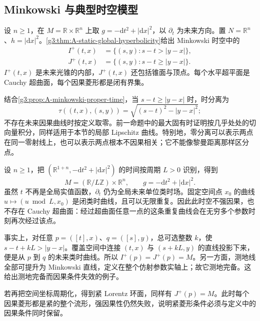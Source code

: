 \subsection{Minkowski 与典型时空模型}
\label{g3:subsec:A02:03}

\begin{example}\label{g3:exm:A-minkowski-causal-structure}
	设 \(n\ge1\)，在 \(M=\mathbb R\times\mathbb R^n\) 上取 \(g=-\mathrm dt^2+|\mathrm dx|^2\)，以 \(\partial_t\) 为未来方向。置 \(N=\mathbb R^n\)、\(h=|\mathrm dx|^2\)。\cref{g3:thm:A-static-global-hyperbolicity}给出 Minkowski 时空中的
	\[
	\begin{aligned}
		I^+(t,x)&=\{(s,y):s-t>|y-x|\},\\
		J^+(t,x)&=\{(s,y):s-t\ge|y-x|\}.
	\end{aligned}
	\]
	\(I^+(t,x)\) 是未来光锥的内部，\(J^+(t,x)\) 还包括锥面与顶点。每个水平超平面是 Cauchy 超曲面，每个因果菱形都是闭有界集。

	结合\cref{g3:prop:A-minkowski-proper-time}，当 \(s-t\ge|y-x|\) 时，时分离为
	\[
		\tau((t,x),(s,y))=\sqrt{(s-t)^2-|y-x|^2};
	\]
	不存在未来因果曲线时按定义取零。前一命题中的最大固有时证明按几乎处处的切向量积分，同样适用于本节的局部 Lipschitz 曲线。特别地，零分离可以表示两点在同一零射线上，也可以表示两点根本不因果相关；它不能像黎曼距离那样区分点。
\end{example}

\begin{example}\label{g3:exm:A-periodic-time-cylinder}
	设 \(n\ge1\)，把 \((\mathbb R^{1+n},-\mathrm dt^2+|\mathrm dx|^2)\) 的时间按周期 \(L>0\) 识别，得到
	\[
		M=(\mathbb R/L\mathbb Z)\times\mathbb R^n,
		\qquad g=-\mathrm dt^2+|\mathrm dx|^2.
	\]
	虽然 \(t\) 不再是全局实值函数，\(\partial_t\) 仍为全局未来单位类时场。固定空间点 \(x_0\) 的曲线 \(u\mapsto(u\bmod L,x_0)\) 是闭类时曲线，且可以无限重复。因此此时空不强因果，也不存在 Cauchy 超曲面：经过超曲面任意一点的这条重复曲线会在无穷多个参数时刻再次经过该点。

	事实上，对任意 \(p=([t],x)\)、\(q=([s],y)\)，总可选整数 \(k\)，使 \(s-t+kL>|y-x|\)。覆盖空间中连接 \((t,x)\) 与 \((s+kL,y)\) 的直线投影下来，便是从 \(p\) 到 \(q\) 的未来类时曲线。所以 \(I^+(p)=J^+(p)=M\)。另一方面，测地线全部可提升为 Minkowski 直线，定义在整个仿射参数实轴上；故它测地完备。这给出测地完备而因果条件失效的例子。

	若再把空间坐标周期化，得到紧 Lorentz 环面，同样有 \(J^+(p)=M\)。此时每个因果菱形都是紧的整个流形，强因果性仍然失败，说明紧菱形条件必须与定义中的因果条件同时保留。
\end{example}

